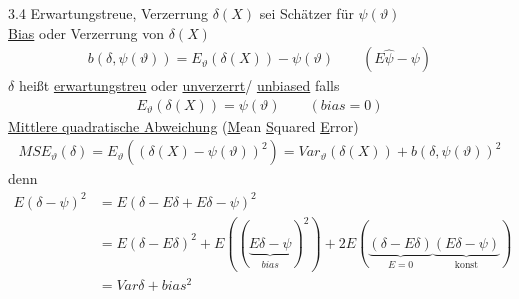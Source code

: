 \documentclass[a4paper,openany]{book}
\theoremstyle{mytheoremstyle}
\theoremstyle{mytheoremstyle2}
\begin{document}
\begin{defi}{3.4 Erwartungstreue, Verzerrung}{}
  $\delta (X)$ sei Schätzer für $\psi (\vartheta )$  \\
  \underline{Bias} oder Verzerrung von $\delta (X)$
  \begin{align*}
    b(\delta ,\psi (\vartheta ))=E_{\vartheta }(\delta(X))-\psi (\vartheta ) \qquad(E \hat{\psi }-\psi )
  \end{align*}
  $\delta $ heißt \underline{erwartungstreu} oder \underline{unverzerrt}/ \underline{unbiased} falls
  \begin{align*}
    E _{\vartheta }(\delta (X))=\psi (\vartheta )\qquad(bias=0)
  \end{align*}
  \underline{Mittlere quadratische Abweichung} (\underline{M}ean \underline{S}quared \underline{E}rror)
  \begin{align*}
    MSE _{\vartheta }(\delta )=E _{\vartheta }\left( (\delta (X)-\psi (\vartheta ))^2 \right)=Var _{\vartheta }(\delta (X))+b(\delta ,\psi (\vartheta ))^2
  \end{align*}
  denn 
  \begin{align*}
    E(\delta -\psi )^2 &= E(\delta -E \delta +E  \delta   -\psi )^2\\
                       &=E(\delta -E \delta )^2+E((\underbrace{E \delta  -\psi }_{bias}) ^2)+2E(\underbrace{(\delta -E \delta )}_{E=0}\underbrace{(E \delta -\psi )}_{\text{konst}}) \\
                       &= Var \delta +bias^2
  \end{align*}
\end{defi}
\end{document}
